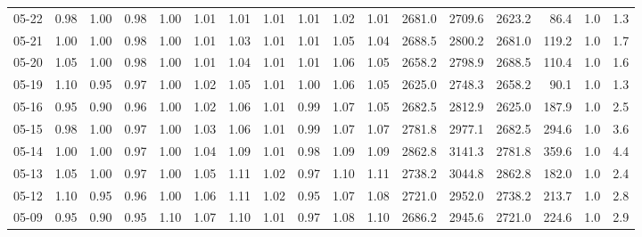 \begin{threeparttable}
{\begin{tabular}{lrrrrrrrrrrrrrrrr}
  05-22 &   0.98 &   1.00 &         0.98 &     1.00 &           1.01 &        1.01 &        1.01 &        1.01 &          1.02 &          1.01 & 2681.0 & 2709.6 & 2623.2 &       86.4 &                      1.0 &                 1.3 \\
  05-21 &   1.00 &   1.00 &         0.98 &     1.00 &           1.01 &        1.03 &        1.01 &        1.01 &          1.05 &          1.04 & 2688.5 & 2800.2 & 2681.0 &      119.2 &                      1.0 &                 1.7 \\
  05-20 &   1.05 &   1.00 &         0.98 &     1.00 &           1.01 &        1.04 &        1.01 &        1.01 &          1.06 &          1.05 & 2658.2 & 2798.9 & 2688.5 &      110.4 &                      1.0 &                 1.6 \\
  05-19 &   1.10 &   0.95 &         0.97 &     1.00 &           1.02 &        1.05 &        1.01 &        1.00 &          1.06 &          1.05 & 2625.0 & 2748.3 & 2658.2 &       90.1 &                      1.0 &                 1.3 \\
  05-16 &   0.95 &   0.90 &         0.96 &     1.00 &           1.02 &        1.06 &        1.01 &        0.99 &          1.07 &          1.05 & 2682.5 & 2812.9 & 2625.0 &      187.9 &                      1.0 &                 2.5 \\
  05-15 &   0.98 &   1.00 &         0.97 &     1.00 &           1.03 &        1.06 &        1.01 &        0.99 &          1.07 &          1.07 & 2781.8 & 2977.1 & 2682.5 &      294.6 &                      1.0 &                 3.6 \\
  05-14 &   1.00 &   1.00 &         0.97 &     1.00 &           1.04 &        1.09 &        1.01 &        0.98 &          1.09 &          1.09 & 2862.8 & 3141.3 & 2781.8 &      359.6 &                      1.0 &                 4.4 \\
  05-13 &   1.05 &   1.00 &         0.97 &     1.00 &           1.05 &        1.11 &        1.02 &        0.97 &          1.10 &          1.11 & 2738.2 & 3044.8 & 2862.8 &      182.0 &                      1.0 &                 2.4 \\
  05-12 &   1.10 &   0.95 &         0.96 &     1.00 &           1.06 &        1.11 &        1.02 &        0.95 &          1.07 &          1.08 & 2721.0 & 2952.0 & 2738.2 &      213.7 &                      1.0 &                 2.8 \\
  05-09 &   0.95 &   0.90 &         0.95 &     1.10 &           1.07 &        1.10 &        1.01 &        0.97 &          1.08 &          1.10 & 2686.2 & 2945.6 & 2721.0 &      224.6 &                      1.0 &                 2.9 \\

\end{tabular}}
\end{threeparttable}
